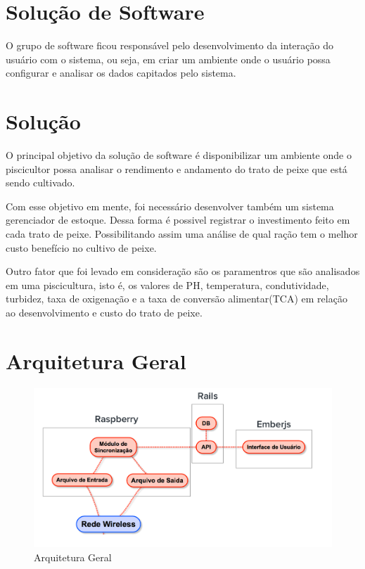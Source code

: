 \section{Solução de Software}
O grupo de software ficou responsável pelo desenvolvimento da interação do usuário com o sistema, ou seja, em criar um ambiente onde o usuário possa configurar e analisar os dados capitados pelo sistema.

\section{Solução}
O principal objetivo da solução de software é disponibilizar um ambiente onde o piscicultor possa analisar o rendimento e andamento do trato de peixe que está sendo cultivado.

Com esse objetivo em mente, foi necessário desenvolver também um sistema gerenciador de estoque. Dessa forma é possivel registrar o investimento feito em cada trato de peixe. Possibilitando assim uma análise de qual ração tem o melhor custo benefício no cultivo de peixe.

Outro fator que foi levado em consideração são os paramentros que são analisados em uma piscicultura, isto é, os valores de PH, temperatura, condutividade, turbidez, taxa de oxigenação e a taxa de conversão alimentar(TCA) em relação ao desenvolvimento e custo do trato de peixe.

\section{Arquitetura Geral}

\begin{figure}[H]
    \centering
    \includegraphics[scale=0.5]{figuras/arquitetura_geral}
    \caption{Arquitetura Geral}
    \label{fig:arquitetura_geral}
\end{figure}

